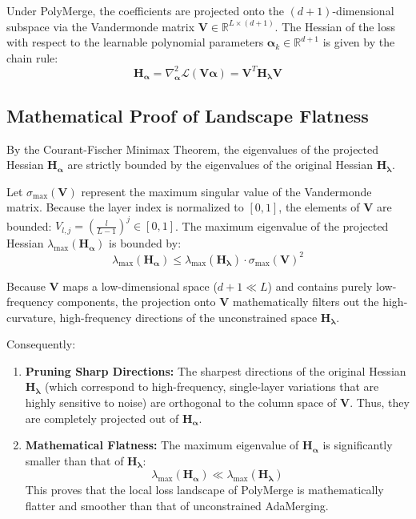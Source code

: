 Under PolyMerge, the coefficients are projected onto the $(d+1)$-dimensional subspace via the Vandermonde matrix $\mathbf{V} \in \mathbb{R}^{L \times (d+1)}$. The Hessian of the loss with respect to the learnable polynomial parameters $\boldsymbol{\alpha}_k \in \mathbb{R}^{d+1}$ is given by the chain rule:
\begin{equation}
\mathbf{H}_{\boldsymbol{\alpha}} = \nabla^2_{\boldsymbol{\alpha}} \mathcal{L}(\mathbf{V}\boldsymbol{\alpha}) = \mathbf{V}^T \mathbf{H}_{\boldsymbol{\lambda}} \mathbf{V}
\end{equation}

\subsection{Mathematical Proof of Landscape Flatness}
By the Courant-Fischer Minimax Theorem, the eigenvalues of the projected Hessian $\mathbf{H}_{\boldsymbol{\alpha}}$ are strictly bounded by the eigenvalues of the original Hessian $\mathbf{H}_{\boldsymbol{\lambda}}$.

Let $\sigma_{\max}(\mathbf{V})$ represent the maximum singular value of the Vandermonde matrix. Because the layer index is normalized to $[0, 1]$, the elements of $\mathbf{V}$ are bounded: $V_{l, j} = \left(\frac{l}{L-1}\right)^j \in [0, 1]$. The maximum eigenvalue of the projected Hessian $\lambda_{\max}(\mathbf{H}_{\boldsymbol{\alpha}})$ is bounded by:
\begin{equation}
\lambda_{\max}(\mathbf{H}_{\boldsymbol{\alpha}}) \leq \lambda_{\max}(\mathbf{H}_{\boldsymbol{\lambda}}) \cdot \sigma_{\max}(\mathbf{V})^2
\end{equation}

Because $\mathbf{V}$ maps a low-dimensional space ($d+1 \ll L$) and contains purely low-frequency components, the projection onto $\mathbf{V}$ mathematically filters out the high-curvature, high-frequency directions of the unconstrained space $\mathbf{H}_{\boldsymbol{\lambda}}$. 

Consequently:
\begin{enumerate}
    \item \textbf{Pruning Sharp Directions:} The sharpest directions of the original Hessian $\mathbf{H}_{\boldsymbol{\lambda}}$ (which correspond to high-frequency, single-layer variations that are highly sensitive to noise) are orthogonal to the column space of $\mathbf{V}$. Thus, they are completely projected out of $\mathbf{H}_{\boldsymbol{\alpha}}$.
    \item \textbf{Mathematical Flatness:} The maximum eigenvalue of $\mathbf{H}_{\boldsymbol{\alpha}}$ is significantly smaller than that of $\mathbf{H}_{\boldsymbol{\lambda}}$:
    \begin{equation}
    \lambda_{\max}(\mathbf{H}_{\boldsymbol{\alpha}}) \ll \lambda_{\max}(\mathbf{H}_{\boldsymbol{\lambda}})
    \end{equation}
    This proves that the local loss landscape of PolyMerge is mathematically flatter and smoother than that of unconstrained AdaMerging.
\end{enumerate}

